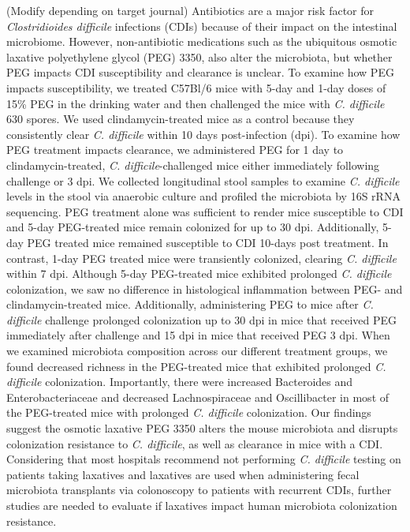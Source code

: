 \documentclass[
  11pt,
]{article}
\begin{document}
(Modify depending on target journal) Antibiotics are a major risk factor
for \emph{Clostridioides difficile} infections (CDIs) because of their
impact on the intestinal microbiome. However, non-antibiotic medications
such as the ubiquitous osmotic laxative polyethylene glycol (PEG) 3350,
also alter the microbiota, but whether PEG impacts CDI susceptibility
and clearance is unclear. To examine how PEG impacts susceptibility, we
treated C57Bl/6 mice with 5-day and 1-day doses of 15\% PEG in the
drinking water and then challenged the mice with \emph{C. difficile} 630
spores. We used clindamycin-treated mice as a control because they
consistently clear \emph{C. difficile} within 10 days post-infection
(dpi). To examine how PEG treatment impacts clearance, we administered
PEG for 1 day to clindamycin-treated, \emph{C. difficile}-challenged
mice either immediately following challenge or 3 dpi. We collected
longitudinal stool samples to examine \emph{C. difficile} levels in the
stool via anaerobic culture and profiled the microbiota by 16S rRNA
sequencing. PEG treatment alone was sufficient to render mice
susceptible to CDI and 5-day PEG-treated mice remain colonized for up to
30 dpi. Additionally, 5-day PEG treated mice remained susceptible to CDI
10-days post treatment. In contrast, 1-day PEG treated mice were
transiently colonized, clearing \emph{C. difficile} within 7 dpi.
Although 5-day PEG-treated mice exhibited prolonged \emph{C. difficile}
colonization, we saw no difference in histological inflammation between
PEG- and clindamycin-treated mice. Additionally, administering PEG to
mice after \emph{C. difficile} challenge prolonged colonization up to 30
dpi in mice that received PEG immediately after challenge and 15 dpi in
mice that received PEG 3 dpi. When we examined microbiota composition
across our different treatment groups, we found decreased richness in
the PEG-treated mice that exhibited prolonged \emph{C. difficile}
colonization. Importantly, there were increased Bacteroides and
Enterobacteriaceae and decreased Lachnospiraceae and Oscillibacter in
most of the PEG-treated mice with prolonged \emph{C. difficile}
colonization. Our findings suggest the osmotic laxative PEG 3350 alters
the mouse microbiota and disrupts colonization resistance to \emph{C.
difficile}, as well as clearance in mice with a CDI. Considering that
most hospitals recommend not performing \emph{C. difficile} testing on
patients taking laxatives and laxatives are used when administering
fecal microbiota transplants via colonoscopy to patients with recurrent
CDIs, further studies are needed to evaluate if laxatives impact human
microbiota colonization resistance.
\end{document}
